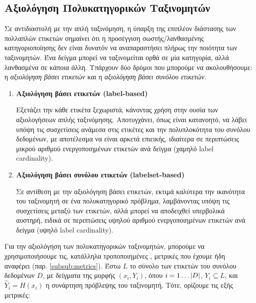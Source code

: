 \subsection{Αξιολόγηση Πολυκατηγορικών Ταξινομητών}
Σε αντιδιαστολή με την απλή ταξινόμηση, η ύπαρξη της επιπλέον διάστασης των πολλαπλών ετικετών σημαίνει ότι η προσέγγιση σωστής/λανθασμένης κατηγοριοποίησης δεν είναι δυνατόν να αναπαραστήσει πλήρως την ποιότητα των ταξινομητών. Ένα δείγμα μπορεί να ταξινομείται ορθά σε μία κατηγορία, αλλά λανθασμένα σε κάποια άλλη. Υπάρχουν δύο δρόμοι που μπορούμε να ακολουθήσουμε: η \emph{αξιολόγηση βάσει ετικετών} και η \emph{αξιολόγηση βάσει συνόλου ετικετών}. 

\begin{enumerate}
\item \textbf{Αξιολόγηση βάσει ετικετών (label-based)}

Εξετάζει την κάθε ετικέτα ξεχωριστά, κάνοντας χρήση στην ουσία των αξιολογήσεων απλής ταξινόμησης. Αποτυγχάνει, όπως είναι κατανοητό, να λάβει υπόψη τις συσχετίσεις ανάμεσα στις ετικέτες και την πολυπλοκότητα του συνόλου δεδομένων, με αποτέλεσμα να είναι αρκετά επιεικής, ιδιαίτερα σε περιπτώσεις μικρού αριθμού ενεργοποιημένων ετικετών ανά δείγμα (χαμηλό label cardinality).
\item \textbf{Αξιολόγηση βάσει συνόλου ετικετών (labelset-based)}

Σε αντίθεση με την αξιολόγηση βάσει ετικετών, εκτιμά καλύτερα την ικανότητα του ταξινομητή σε ένα πολυκατηγορικό πρόβλημα, λαμβάνοντας υπόψη τις συσχετίσεις μεταξύ των ετικετών, αλλά μπορεί να αποδειχθεί υπερβολικά αυστηρή, ειδικά σε περιπτώσεις υψηλού αριθμού ενεργοποιημένων ετικετών ανά δείγμα (υψηλό label cardinality).
\end{enumerate}

Για την αξιολόγηση των πολυκατηγορικών ταξινομητών, μπορούμε να χρησιμοποιήσουμε τις, κατάλληλα τροποποιημένες \cite{li2006empirical}, μετρικές που έχουμε ήδη αναφέρει (παρ. \ref{subsub:metrics}). Έστω $L$ το σύνολο των ετικετών του συνόλου δεδομένων $D$, με δείγματα της μορφής $(x_{i}, Y_{i})$, όπου $i = 1 \dots \lvert D\rvert$, $Y_{i} \subseteq L$, και $\hat{Y}_{i} = H(x_{i})$ η συνάρτηση πρόβλεψης του ταξινομητή. Τότε, ορίζουμε τις εξής μετρικές:

